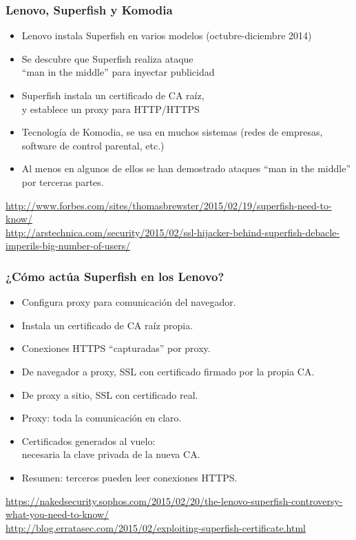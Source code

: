 \begin{frame}
\frametitle{Lenovo, Superfish y Komodia}

{\large
\begin{itemize}
\item Lenovo instala Superfish en varios modelos (octubre-diciembre 2014)
\item Se descubre que Superfish realiza ataque \\
  ``man in the middle'' para inyectar publicidad \\
\item Superfish instala un certificado de CA raíz, \\
  y establece un proxy para HTTP/HTTPS \\
\item Tecnología de Komodia, se usa en muchos sistemas (redes de empresas, software de control parental, etc.)
\item Al menos en algunos de ellos se han demostrado ataques ``man in the middle'' por terceras partes.
\end{itemize}
}

\begin{flushright}
{\footnotesize
\url{http://www.forbes.com/sites/thomasbrewster/2015/02/19/superfish-need-to-know/} \\
\url{http://arstechnica.com/security/2015/02/ssl-hijacker-behind-superfish-debacle-imperils-big-number-of-users/} \\
}
\end{flushright}
\end{frame}

\begin{frame}
\frametitle{¿Cómo actúa Superfish en los Lenovo?}

{\Large
\begin{itemize}
\item Configura proxy para comunicación del navegador.
\item Instala un certificado de CA raíz propia.
\item Conexiones HTTPS ``capturadas'' por proxy.
\item De navegador a proxy, SSL con certificado firmado por la propia CA.
\item De proxy a sitio, SSL con certificado real.
\item Proxy: toda la comunicación en claro.
\item Certificados generados al vuelo: \\
  necesaria la clave privada de la nueva CA. \\
\item Resumen: terceros pueden leer conexiones HTTPS.
\end{itemize}
}

\begin{flushright}
{\footnotesize
\url{https://nakedsecurity.sophos.com/2015/02/20/the-lenovo-superfish-controversy-what-you-need-to-know/} \\
\url{http://blog.erratasec.com/2015/02/exploiting-superfish-certificate.html} \\
}
\end{flushright}
\end{frame}
